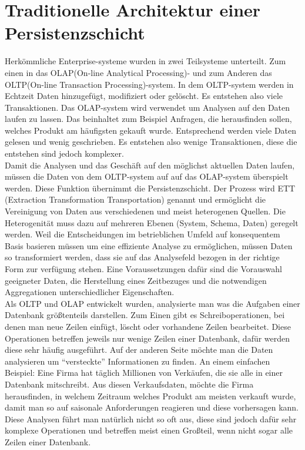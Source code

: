 %
\section{Traditionelle Architektur einer Persistenzschicht}
Herkömmliche Enterprise-systeme wurden in zwei Teilsysteme unterteilt. Zum einen in das OLAP(On-line Analytical Processing)- und zum Anderen das OLTP(On-line Transaction Processing)-system. In dem OLTP-system werden in Echtzeit Daten hinzugefügt, modifiziert oder gelöscht. Es entstehen also viele Transaktionen. Das OLAP-system wird verwendet um Analysen auf den Daten laufen zu lassen. Das beinhaltet zum Beispiel Anfragen, die herausfinden sollen, welches Produkt am häufigsten gekauft wurde. Entsprechend werden viele Daten gelesen und wenig geschrieben. Es entstehen also wenige Transaktionen, diese die entstehen sind jedoch komplexer.
\\
Damit die Analysen und das Geschäft auf den möglichst aktuellen Daten laufen, müssen die Daten von dem OLTP-system auf auf das OLAP-system überspielt werden. Diese Funktion übernimmt die Persistenzschicht. Der Prozess wird ETT (Extraction Transformation Transportation) genannt und ermöglicht die Vereinigung von Daten aus verschiedenen und meist heterogenen Quellen. Die Heterogenität muss dazu auf  mehreren  Ebenen  (System, Schema,  Daten)  geregelt werden. Weil die Entscheidungen im betrieblichen Umfeld auf konsequentem Basis basieren müssen um eine effiziente Analyse zu ermöglichen, müssen Daten so transformiert werden, dass sie auf das Analysefeld bezogen in der richtige Form zur verfügung stehen. Eine Voraussetzungen dafür sind die Vorauswahl geeigneter Daten, die Herstellung eines Zeitbezuges und die notwendigen Aggregationen unterschiedlicher Eigenschaften.\cite{koppen2014data}
\\
Als OLTP und OLAP entwickelt wurden, analysierte man was die Aufgaben einer Datenbank größtenteils darstellen. Zum Einen gibt es Schreiboperationen, bei denen man neue Zeilen einfügt, löscht oder vorhandene Zeilen bearbeitet. Diese Operationen betreffen jeweils nur wenige Zeilen einer Datenbank, dafür werden diese sehr häufig ausgeführt. Auf der anderen Seite möchte man die Daten analysieren um “versteckte” Informationen zu finden. An einem einfachen Beispiel: Eine Firma hat täglich Millionen von Verkäufen, die sie alle in einer Datenbank mitschreibt. Aus diesen Verkaufsdaten, möchte die Firma herausfinden, in welchem Zeitraum welches Produkt am meisten verkauft wurde, damit man so auf saisonale Anforderungen reagieren und diese vorhersagen kann. Diese Analysen führt man natürlich nicht so oft aus, diese sind jedoch dafür sehr komplexe Operationen und betreffen meist einen Großteil, wenn nicht sogar alle Zeilen einer Datenbank.
